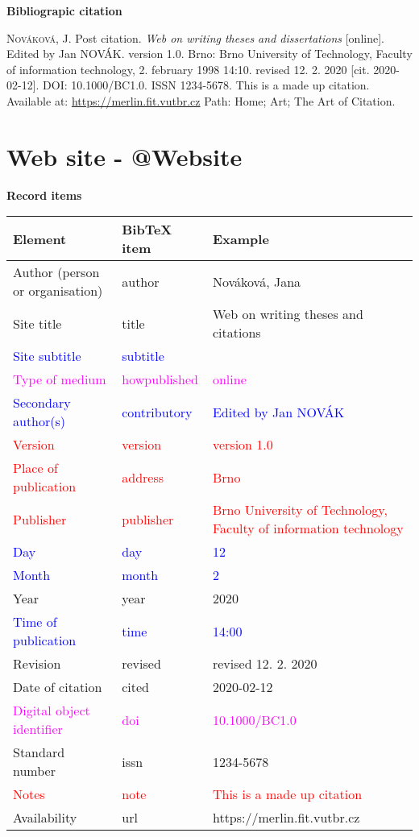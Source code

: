 \bigskip

\noindent \textbf{Bibliograpic citation}

\medskip

\noindent \textsc{Nováková}, J. Post citation. \textit{Web on writing theses and dissertations} [online]. Edited by Jan NOVÁK. version 1.0. Brno: Brno University of Technology, Faculty of information technology, 2. february 1998 14:10. revised 12. 2. 2020 [cit. 2020-02-12]. DOI: 10.1000/BC1.0. ISSN 1234-5678. This is a made up citation. Available at: \url{https://merlin.fit.vutbr.cz} Path: Home; Art; The Art of Citation.
\newpage
\section*{Web site - @Website}
\label{pr-website}
\noindent \textbf{Record items}

\medskip

\begin{tabularx}{\linewidth}{X X X}
    Element & BibTeX item & Example\\\hline
    Author (person or organisation) & author & Nováková, Jana\\
    Site title & title & Web on writing theses and citations\\
    \textcolor{blue}{Site subtitle} &  \textcolor{blue}{subtitle} & \\
    \textcolor{magenta}{Type of medium} & \textcolor{magenta}{howpublished} & \textcolor{magenta}{online}\\
    \textcolor{blue}{Secondary author(s)} & \textcolor{blue}{contributory} & \textcolor{blue}{Edited by Jan NOVÁK}\\
    \textcolor{red}{Version} & \textcolor{red}{version} & \textcolor{red}{version 1.0}\\
    \textcolor{red}{Place of publication} & \textcolor{red}{address} & \textcolor{red}{Brno}\\
    \textcolor{red}{Publisher} & \textcolor{red}{publisher} & \textcolor{red}{Brno University of Technology, Faculty of information technology}\\
    \textcolor{blue}{Day} & \textcolor{blue}{day} & \textcolor{blue}{12}\\
    \textcolor{blue}{Month} & \textcolor{blue}{month} & \textcolor{blue}{2}\\
    Year & year & 2020\\
    \textcolor{blue}{Time of publication} & \textcolor{blue}{time} & \textcolor{blue}{14:00}\\
    Revision & revised & revised 12. 2. 2020\\
    Date of citation & cited & 2020-02-12\\
    \textcolor{magenta}{Digital object identifier} & \textcolor{magenta}{doi} & \textcolor{magenta}{10.1000/BC1.0}\\
    Standard number & issn & 1234-5678\\
    \textcolor{red}{Notes} & \textcolor{red}{note} & \textcolor{red}{This is a made up citation}\\
    Availability & url & https://merlin.fit.vutbr.cz
\end{tabularx}

